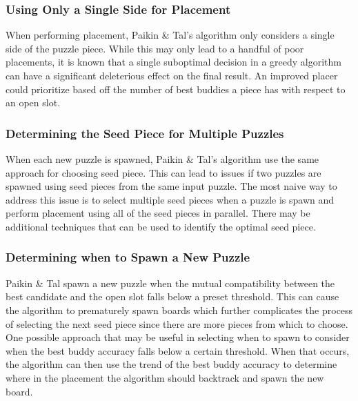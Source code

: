 \documentclass{report}
\begin{document}
\subsubsection{Using Only a Single Side for Placement}\label{sec:limitationPlacementSingleSide}

When performing placement, Paikin \& Tal's algorithm only considers a single side of the puzzle piece.  While this may only lead to a handful of poor placements, it is known that a single suboptimal decision in a greedy algorithm can have a significant deleterious effect on the final result.  An improved placer could prioritize based off the number of best buddies a piece has with respect to an open slot.

\subsubsection{Determining the Seed Piece for Multiple Puzzles}\label{sec:limitationSeedPieceMultiplePuzzles}

When each new puzzle is spawned, Paikin \& Tal's algorithm use the same approach for choosing seed piece.  This can lead to issues if two puzzles are spawned using seed pieces from the same input puzzle.  The most naive way to address this issue is to select multiple seed pieces when a puzzle is spawn and perform placement using all of the seed pieces in parallel.  There may be additional techniques that can be used to identify the optimal seed piece.

\subsubsection{Determining when to Spawn a New Puzzle}\label{sec:limitationWhenToSpawnNewPuzzle}

Paikin \& Tal spawn a new puzzle when the mutual compatibility between the best candidate and the open slot falls below a preset threshold.  This can cause the algorithm to prematurely spawn boards which further complicates the process of selecting the next seed piece since there are more pieces from which to choose.  One possible approach that may be useful in selecting when to spawn to consider when the best buddy accuracy falls below a certain threshold.  When that occurs, the algorithm can then use the trend of the best buddy accuracy to determine where in the placement the algorithm should backtrack and spawn the new board.


\end{document}
